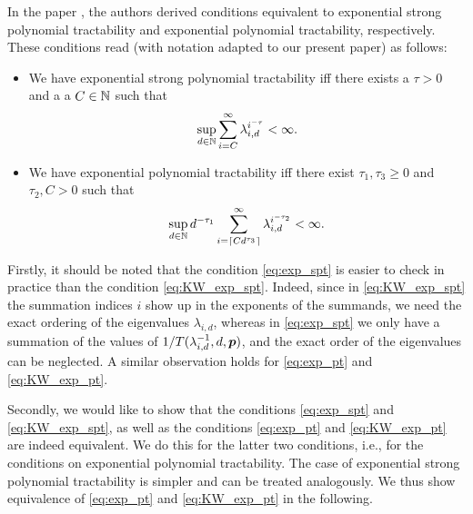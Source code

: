 \documentclass[sort&compress]{elsarticle}
\newcommand{\peter}[1]{\begingroup\color{violet}#1\endgroup}
\begin{document}
\peter{
In the paper \cite{KriWoz19a}, the authors derived conditions equivalent to exponential strong polynomial tractability and exponential polynomial tractability, respectively. These conditions read (with notation adapted to our present paper) as follows:
\begin{itemize}
    \item We have exponential strong polynomial tractability iff there exists a $\tau>0$ and a 
    a $C\in\mathbb{N}$ such that
    \begin{equation}\label{eq:KW_exp_spt}
        \sup_{d\in\mathbb{N}} \sum_{i=C}^{\infty} \lambda_{i,d}^{i^{-\tau}} < \infty. 
    \end{equation}
    \item We have exponential polynomial tractability iff there exist $\tau_1,\tau_3\ge 0$ and $\tau_2, C>0$ such that
    \begin{equation}\label{eq:KW_exp_pt}
        \sup_{d\in\mathbb{N}} d^{-\tau_1} \sum_{i=\lceil C d^{\tau_3} \rceil}^{\infty} \lambda_{i,d}^{i^{-\tau_2}} < \infty. 
    \end{equation}
\end{itemize}
Firstly, it should be noted that the condition \eqref{eq:exp_spt} is easier to check in practice than the condition \eqref{eq:KW_exp_spt}. Indeed, since in \eqref{eq:KW_exp_spt} the summation indices $i$ show up in the exponents of the summands, we need the exact ordering of the eigenvalues $\lambda_{i,d}$, whereas in \eqref{eq:exp_spt} we only have a summation of the values of $1/T(\lambda_{i,d}^{-1},d,\boldsymbol{p})$, and the exact order of the eigenvalues can be neglected. A similar 
observation holds for \eqref{eq:exp_pt} and \eqref{eq:KW_exp_pt}. 

Secondly, we would like to show that the conditions \eqref{eq:exp_spt} and \eqref{eq:KW_exp_spt}, as well as the conditions \eqref{eq:exp_pt} and \eqref{eq:KW_exp_pt} are indeed equivalent. We do this for the latter two conditions, i.e., for the conditions on exponential polynomial tractability. The case of exponential strong polynomial tractability is simpler and can be treated analogously. We thus show equivalence of \eqref{eq:exp_pt} and \eqref{eq:KW_exp_pt} in the following. 

}
\end{document}
